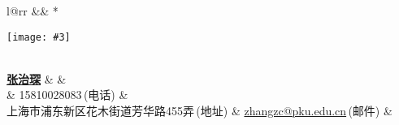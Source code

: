 \newcommand{\paint}[3]{
    \begin{minipage}{#1}
        \texttt{[image: \#3]}
    \end{minipage} 
}
\newcommand{\myheader}{
\begin{tabular*}{\textwidth}{l@{\extracolsep{\fill}}rr}
  && \multirow{4}*{\paint{2.6cm}{3.2cm}{./image.jpg}}\\
  \specialrule{0em}{0pt}{0pt}
  \textbf{\href{http://herechen.github.io}{\LARGE 张治琛}} &  &\\
   & 15810028083$\,${\color{labelgrey}(电话)} & \\
   上海市浦东新区花木街道芳华路455弄$\,${\color{labelgrey}(地址)} & \href{mailto:zhangzc@pku.edu.cn}{zhangzc@pku.edu.cn}$\,${\color{labelgrey}(邮件)} & \\
  \end{tabular*}\\\vspace{0.1in}
}

\myheader

